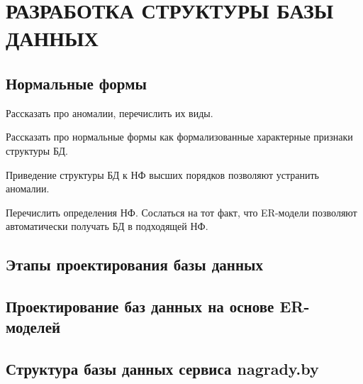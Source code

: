 \section[Разработка структуры БД]{РАЗРАБОТКА СТРУКТУРЫ БАЗЫ ДАННЫХ}

\subsection{Нормальные формы}

Рассказать про аномалии, перечислить их виды.

Рассказать про нормальные формы как формализованные характерные 
признаки структуры БД.

Приведение структуры БД к НФ высших порядков позволяют устранить аномалии.

Перечислить определения НФ. Сослаться на тот факт, что ER-модели позволяют автоматически
получать БД в подходящей НФ.

\subsection{Этапы проектирования базы данных}

\subsection{Проектирование баз данных на основе ER-моделей}

\subsection{Структура базы данных сервиса nagrady.by}
